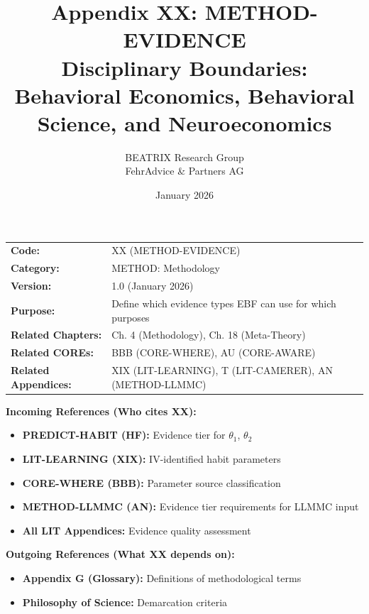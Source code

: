 \documentclass[11pt, a4paper]{article}
\title{Appendix XX: METHOD-EVIDENCE\\
Disciplinary Boundaries: Behavioral Economics, Behavioral Science, and Neuroeconomics}
\author{BEATRIX Research Group \\ FehrAdvice \& Partners AG}
\date{January 2026}
\begin{document}
\maketitle


\begin{tcolorbox}[colback=gray!10!white, colframe=gray!75!black, title=Appendix Metadata]
\begin{tabular}{@{}ll@{}}
\textbf{Code:} & XX (METHOD-EVIDENCE) \\
\textbf{Category:} & METHOD: Methodology \\
\textbf{Version:} & 1.0 (January 2026) \\
\textbf{Purpose:} & Define which evidence types EBF can use for which purposes \\
\textbf{Related Chapters:} & Ch. 4 (Methodology), Ch. 18 (Meta-Theory) \\
\textbf{Related COREs:} & BBB (CORE-WHERE), AU (CORE-AWARE) \\
\textbf{Related Appendices:} & XIX (LIT-LEARNING), T (LIT-CAMERER), AN (METHOD-LLMMC) \\
\end{tabular}
\end{tcolorbox}


\begin{tcolorbox}[colback=cyan!5!white, colframe=cyan!75!black, title=Cross-Reference Map]
\textbf{Incoming References (Who cites XX):}
\begin{itemize}[nosep]
    \item \textbf{PREDICT-HABIT (HF):} Evidence tier for $\theta_1$, $\theta_2$
    \item \textbf{LIT-LEARNING (XIX):} IV-identified habit parameters
    \item \textbf{CORE-WHERE (BBB):} Parameter source classification
    \item \textbf{METHOD-LLMMC (AN):} Evidence tier requirements for LLMMC input
    \item \textbf{All LIT Appendices:} Evidence quality assessment
\end{itemize}

\textbf{Outgoing References (What XX depends on):}
\begin{itemize}[nosep]
    \item \textbf{Appendix G (Glossary):} Definitions of methodological terms
    \item \textbf{Philosophy of Science:} Demarcation criteria
\end{itemize}
\end{tcolorbox}
\end{document}
